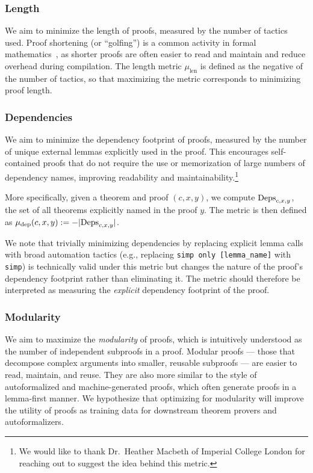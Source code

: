 \subsubsection{Length}

We aim to minimize the length of proofs, measured by the number of tactics used. Proof shortening (or ``golfing'') is a common activity in formal mathematics~\cite{Mathlib}, as shorter proofs are often easier to read and maintain and reduce overhead during compilation. The length metric $\mu_{\mathrm{len}}$ is defined as the negative of the number of tactics, so that maximizing the metric corresponds to minimizing proof length.

\subsubsection{Dependencies}

We aim to minimize the dependency footprint of proofs, measured by the number of unique external lemmas explicitly used in the proof. This encourages self-contained proofs that do not require the use or memorization of large numbers of dependency names, improving readability and maintainability.\footnote{We would like to thank Dr.\ Heather Macbeth of Imperial College London for reaching out to suggest the idea behind this metric.}

More specifically, given a theorem and proof $(c, x, y)$, we compute $\text{Deps}_{c,x,y}$, the set of all theorems explicitly named in the proof $y$. The metric is then defined as $\mu_{\mathrm{dep}}(c, x, y) := -|\text{Deps}_{c,x,y}|$.

We note that trivially minimizing dependencies by replacing explicit lemma calls with broad automation tactics (e.g., replacing \texttt{simp only [lemma\_name]} with \texttt{simp}) is technically valid under this metric but changes the nature of the proof's dependency footprint rather than eliminating it. The metric should therefore be interpreted as measuring the \emph{explicit} dependency footprint of the proof.

\subsubsection{Modularity}

We aim to maximize the \textit{modularity} of proofs, which is intuitively understood as the number of independent subproofs in a proof. Modular proofs --- those that decompose complex arguments into smaller, reusable subproofs --- are easier to read, maintain, and reuse. They are also more similar to the style of autoformalized and machine-generated proofs, which often generate proofs in a lemma-first manner. We hypothesize that optimizing for modularity will improve the utility of proofs as training data for downstream theorem provers and autoformalizers.

